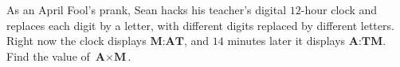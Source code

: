 As an April Fool's prank, Sean hacks his teacher's digital $12$-hour clock and replaces each digit by a letter, with different digits replaced by different letters. Right now the clock displays $\textbf{M:AT}$, and $14$ minutes later it displays $\textbf{A:TM}$. Find the value of $\textbf{A}\times\textbf{M}$.
